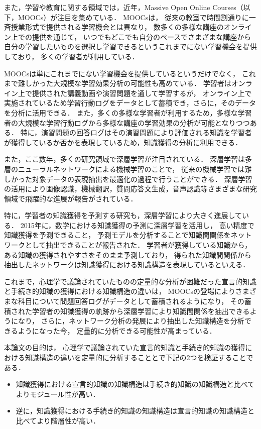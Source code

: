 \documentclass[twocolumn,a4j,10pt]{jsarticle}
\begin{document}
また，学習や教育に関する領域では，近年，Massive Open Online Courses（以下，MOOCs）が注目を集めている．
MOOCsは，
従来の教室で時間割通りに一斉授業形式で提供される学習機会とは異なり，
数多くの多様な講座のオンライン上での提供を通じて，
いつでもどこでも自分のペースでさまざまな講座から自分の学習したいものを選択し学習できるというこれまでにない学習機会を提供しており，
多くの学習者が利用している．


MOOCsは単にこれまでにない学習機会を提供しているというだけでなく，
これまで難しかった大規模な学習効果分析の可能性も高めている．
学習者はオンライン上で提供された講義動画や演習問題を通して学習するが，
オンライン上で実施されているため学習行動ログをデータとして蓄積でき，さらに，そのデータを分析に活用できる．
また，多くの多様な学習者が利用するため，多様な学習者の大規模な学習行動ログから多様な講座の学習効果の分析が可能となりつつある．
特に，演習問題の回答ログはその演習問題により評価される知識を学習者が獲得しているか否かを表現しているため，知識獲得の分析に利用できる．


また，ここ数年，多くの研究領域で深層学習が注目されている．
深層学習は多層のニューラルネットワークによる機械学習のことで，
従来の機械学習では難しかった対象データの表現抽出を最適化の過程で行うことができる．
深層学習の活用により画像認識，機械翻訳，質問応答文生成，音声認識等さまざまな研究領域で飛躍的な進展が報告がされている．


特に，学習者の知識獲得を予測する研究も，深層学習により大きく進展している．
2015年に，数学における知識獲得の予測に深層学習を活用し，
高い精度で知識獲得を予測できること，
予測モデルを分析することで知識間関係をネットワークとして抽出できることが報告された\cite{piech2015deep}．
学習者が獲得している知識から，ある知識の獲得されやすさをそのまま予測しており，
得られた知識間関係から抽出したネットワークは知識獲得における知識構造を表現しているといえる．


これまで，心理学で議論されていたものの定量的な分析が困難だった宣言的知識と手続き的知識の獲得における知識構造の違いは，
MOOCsの登場によりさまざまな科目について問題回答ログがデータとして蓄積されるようになり，
その蓄積された学習者の知識獲得の軌跡から深層学習により知識間関係を抽出できるようになり，
さらに，ネットワーク分析の発展により抽出した知識構造を分析できるようになった今，
定量的に分析できる可能性が高まっている．



本論文の目的は，
心理学で議論されていた宣言的知識と手続き的知識の獲得における知識構造の違いを定量的に分析することとで下記の2つを検証することである．
\begin{itemize}
\item 知識獲得における宣言的知識の知識構造は手続き的知識の知識構造と比べてよりモジュール性が高い．
\item 逆に，知識獲得における手続き的知識の知識構造は宣言的知識の知識構造と比べてより階層性が高い．
\end{itemize}
\end{document}
